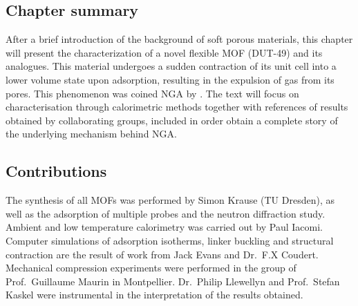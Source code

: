\subsection*{Chapter summary}

After a brief introduction of the background of soft porous 
materials, this chapter will present the characterization of a novel
flexible \gls{MOF} (DUT-49) and its analogues. This material undergoes
a sudden contraction of its unit cell into a lower volume state
upon adsorption, resulting in the expulsion of gas from its pores.
This phenomenon was coined \gls{NGA} by 
\citeauthor{krausePressureamplifyingFrameworkMaterial2016}.
The text will focus on characterisation through calorimetric methods
together with references
of results obtained by collaborating groups, included in order
obtain a complete story of the underlying mechanism behind \gls{NGA}.

\subsection*{Contributions}

The synthesis of all \glspl{MOF} was performed by Simon Krause
(TU Dresden), as well as the adsorption of multiple probes 
and the neutron diffraction study.
Ambient and low temperature calorimetry was carried out by 
Paul Iacomi. Computer simulations of adsorption isotherms, 
linker buckling and structural contraction
are the result of work from Jack Evans and Dr.\ F.X Coudert.
Mechanical compression experiments were performed in 
the group of Prof.\ Guillaume Maurin in Montpellier.
Dr.\ Philip Llewellyn and Prof.\ Stefan Kaskel were 
instrumental in the interpretation of the results obtained.
